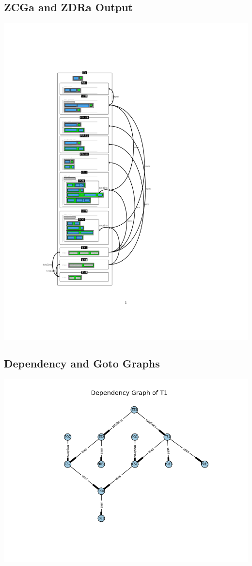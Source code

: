 \subsection{ZCGa and ZDRa Output}
\label{app:vm1n2o}
\includegraphics[clip, trim=3cm 4cm 6cm 4.2cm]{examples/vm/1n2comp.pdf}
%
\subsection{Dependency and Goto Graphs}
\label{app:vm2.5}
\includegraphics[scale=0.7]{examples/vm/25a.png}

